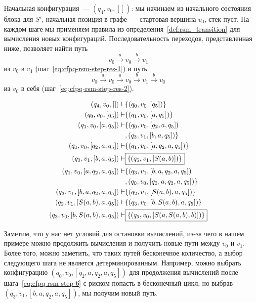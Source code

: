Начальная конфигурация~--- $(q_4,v_0,[])$: мы начинаем из начального состояния блока для $S'$, начальная позиция в графе~--- стартовая вершина $v_0$, стек пуст. На каждом шаге мы применяем правила из определения~\ref{def:rsm_transition} для вычисления новых конфигураций. Последовательность переходов, представленная ниже, позволяет найти путь \[ v_0 \xrightarrow{a} v_0 \xrightarrow{b} v_1 \]
из $v_0$ в $v_1$ (шаг~\ref{eq:cfpq-rsm-step-res-1}) и путь
\[ v_0 \xrightarrow{a} v_0 \xrightarrow{a} v_0 \xrightarrow{b} v_1 \xrightarrow{b} v_0 \]
из $v_0$ в себя (шаг~\ref{eq:cfpq-rsm-step-res-2}).

\begin{align}
    \setcounter{equation}{0}
    (q_4,v_0,[])     \vdash           & \{(q_0,v_0,[q_5])\}                                                   \\
    (q_0,v_0,[q_5])  \vdash           & \{(q_1,v_0,[a,q_5])\}                                                 \\
    (q_1,v_0,[a,q_5])\vdash           & \{(q_0,v_0,[q_2,a,q_5]) \nonumber                                     \\
                                      & , (q_3,v_1,[b,a,q_5])\}                                               \\
    (q_0,v_0,[q_2,a,q_5]) \vdash      & \{(q_1,v_0,[a,q_2,a,q_5])\}                                           \\
    (q_3,v_1,[b,a,q_5])   \vdash      & \boxed{\{(q_5,v_1,[S(a,b)])\}} \label{eq:cfpq-rsm-step-res-1}        \\
    (q_1,v_0,[a,q_2,a,q_5]) \vdash    & \{(q_3,v_1,[b,a,q_2,a,q_5]) \nonumber                                 \\
                                      & , (q_0,v_0,[q_2,a,q_2,a,q_5])\} \label{eq:cfpq-rsm-step-6}           \\
    (q_3,v_1,[b,a,q_2,a,q_5]) \vdash  & \{(q_2,v_1,[S(a,b),a,q_5])\}                                          \\
    (q_2,v_1,[S(a,b),a,q_5]) \vdash   & \{(q_3,v_0,[b,S(a,b),a,q_5])\}                                        \\
    (q_3,v_0,[b,S(a,b),a,q_5]) \vdash & \boxed{\{(q_5,v_0,[S(a,S(a,b),b)])\}} \label{eq:cfpq-rsm-step-res-2}
\end{align}

Заметим, что у нас нет условий для остановки вычислений, из-за чего в нашем примере можно продолжить вычисления и получить новые пути между $v_0$ и $v_1$.
Более того, можно заметить, что таких путей бесконечное количество, а выбор следующего шага не является детерминированным.
Например, можно выбрать конфигурацию $(q_0,v_0,[q_2,a,q_2,a,q_5])$ для продолжения вычислений после шага~\ref{eq:cfpq-rsm-step-6} с риском попасть в бесконечный цикл, но выбрав $(q_3,v_1,[b,a,q_2,a,q_5])$, мы получим новый путь.


